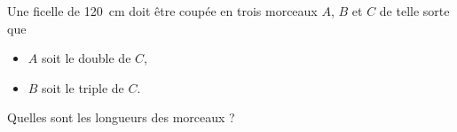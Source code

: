 
\begin{exercice}\label{exo2smath-0279}

    Une ficelle de \SI{120}{\centi\meter} doit être coupée en trois morceaux \( A\), \( B\) et \( C\) de telle sorte que 
    \begin{itemize}
        \item \( A\) soit le double de $C$,
        \item \( B\) soit le triple de \( C\).
    \end{itemize}
    Quelles sont les longueurs des morceaux ? 

\end{exercice}
